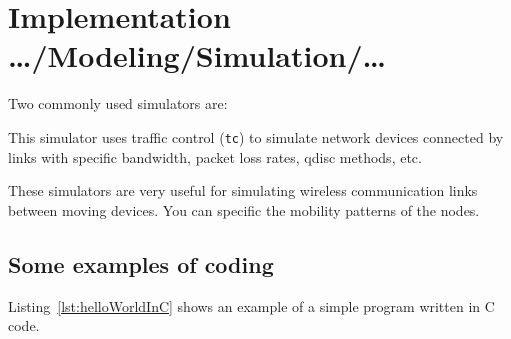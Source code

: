 \begin{table}[!ht]
  \begin{center}
    \caption{Configurations tested}
    \label{tab:configstested}
  \end{center}
\end{table}

\section{Implementation …/Modeling/Simulation/…}
\label{sec:implementationDetails}

Two commonly used simulators are:
\begin{description}[labelwidth =\widthof{\textbf{ns-2 or ns-3 simulator}}, leftmargin = !]
    \item[\textbf{Mininet}] This simulator uses traffic control (\texttt{tc}) to simulate network devices connected by links with specific bandwidth, packet loss rates, qdisc methods, etc.
    
    
    \item[\textbf{ns-2 or ns-3 simulator}] These simulators are very useful for simulating wireless communication links between moving devices. You can specific the mobility patterns of the nodes.
\end{description}

\subsection{Some examples of coding}

Listing~\ref{lst:helloWorldInC} shows an example of a simple program written
in C code.

